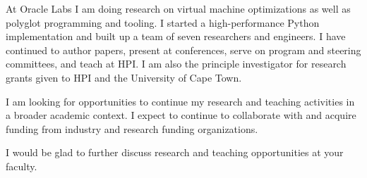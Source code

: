 \documentclass[11pt,a4paper,sans]{moderncv} %
\begin{document}
At Oracle Labs I am doing research on virtual machine optimizations as well as
polyglot programming and tooling. I started a high-performance Python
implementation and built up a team of seven researchers and engineers. I have
continued to author papers, present at conferences, serve on program and
steering committees, and teach at HPI. I am also the principle investigator for
research grants given to HPI and the University of Cape
Town. %

I am looking for opportunities to continue my research and teaching activities
in a broader academic context. I expect to continue to collaborate with and
acquire funding from industry and research funding
organizations. %


I would be glad to further discuss research and teaching opportunities at
your faculty.

\enlargethispage{1cm}
\vspace{2\parskip}
\makeletterclosing %

\newpage

\pagestyle{plain}

\label{sec:cv}


\end{document}
